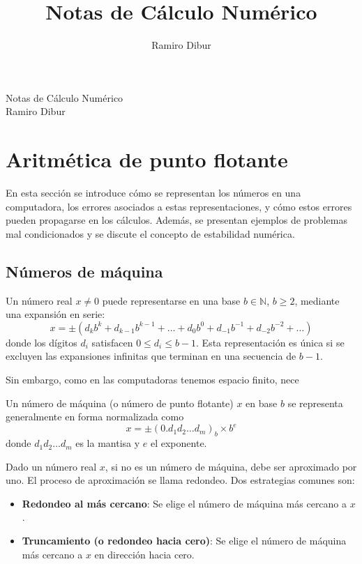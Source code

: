 \documentclass[12pt]{article}
\title{\Huge  \color{maincolor} Notas de Cálculo Numérico}
\author{Ramiro Dibur}
\date{}
\begin{document}
\vspace*{\fill}
\begin{center}
    {\Huge \color{maincolor} Notas de Cálculo Numérico} \\[1em]
    {\large Ramiro Dibur}
\end{center}
\vspace*{\fill}
\newpage
{}
\newpage
\tableofcontents
\newpage

\section{Aritmética de punto flotante}

En esta sección se introduce cómo se representan los números en una computadora, los errores asociados a estas representaciones, y cómo estos errores pueden propagarse en los cálculos. Además, se presentan ejemplos de problemas mal condicionados y se discute el concepto de estabilidad numérica.

\subsection{Números de máquina}

Un número real $x \neq 0$ puede representarse en una base $b \in \mathbb{N}$, $b \ge 2$, mediante una expansión en serie:
$$
    x = \pm \left( d_k b^k + d_{k-1} b^{k-1} + \dots + d_0 b^0 + d_{-1} b^{-1} + d_{-2} b^{-2} + \dots \right)
$$
donde los dígitos $d_i$ satisfacen $0 \le d_i \le b-1$. Esta representación es única si se excluyen las expansiones infinitas que terminan en una secuencia de $b-1$.

Sin embargo, como en las computadoras tenemos espacio finito, nece

\begin{definition}
    Un número de máquina (o número de punto flotante) $x$ en base $b$ se representa generalmente en forma normalizada como
    $$
        x = \pm (0.d_1 d_2 \dots d_m)_b \times b^e
    $$
    donde $d_1 d_2 \dots d_m$ es la mantisa y $e$ el exponente.
\end{definition}

Dado un número real $x$, si no es un número de máquina, debe ser aproximado por uno. El proceso de aproximación se llama redondeo. Dos estrategias comunes son:

\begin{itemize}
    \item \textbf{Redondeo al más cercano}: Se elige el número de máquina más cercano a $x$.
    \item \textbf{Truncamiento (o redondeo hacia cero)}: Se elige el número de máquina más cercano a $x$ en dirección hacia cero.
\end{itemize}
\end{document}
